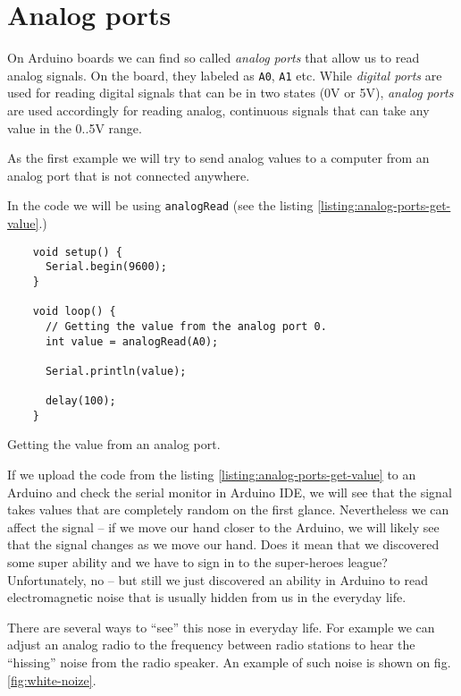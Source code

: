 \documentclass[../sparc.tex]{subfiles}
\begin{document}
\section{Analog ports}
\label{section:analog-ports}

On Arduino boards we can find so called \emph{analog ports} that allow us to
read analog signals.  On the board, they labeled as \texttt{A0}, \texttt{A1}
etc.  While \emph{digital ports} are used for reading digital signals that can
be in two states (0V or 5V), \emph{analog ports} are used accordingly for
reading analog, continuous signals that can take any value in the 0..5V range.

As the first example we will try to send analog values to a computer from an
analog port that is not connected anywhere.

In the code we will be using \texttt{analogRead} (see the listing
\ref{listing:analog-ports-get-value}.)

\begin{listing}[ht]
  \begin{verbatim}
    void setup() {
      Serial.begin(9600);
    }

    void loop() {
      // Getting the value from the analog port 0.
      int value = analogRead(A0);

      Serial.println(value);

      delay(100);
    }
  \end{verbatim}
  \label{listing:analog-ports-get-value}
  \caption{Getting the value from an analog port.}
\end{listing}

If we upload the code from the listing \ref{listing:analog-ports-get-value} to
an Arduino and check the serial monitor in Arduino IDE, we will see that the
signal takes values that are completely random on the first glance.
Nevertheless we can affect the signal -- if we move our hand closer to the
Arduino, we will likely see that the signal changes as we move our hand.  Does
it mean that we discovered some super ability and we have to sign in to the
super-heroes league?  Unfortunately, no -- but still we just discovered an
ability in Arduino to read electromagnetic noise that is usually hidden from us
in the everyday life.

There are several ways to ``see'' this nose in everyday life.  For example we
can adjust an analog radio to the frequency between radio stations to hear the
``hissing'' noise from the radio speaker.  An example of such noise is shown on
fig. \ref{fig:white-noize}.
\end{document}
